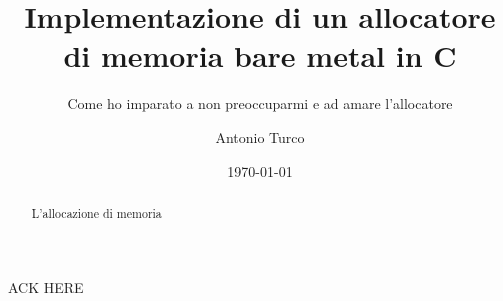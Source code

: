 \documentclass[noexaminfo,oneside,binding=0.6cm]{sapthesis}
\title{Implementazione di un allocatore di memoria bare metal in C}
\subtitle{Come ho imparato a non preoccuparmi e ad amare l'allocatore}
\author{Antonio Turco}
\date{\today}
\begin{document}
\frontmatter  
\maketitle
\dedication{Dedicato a chi rimane curioso per tutta la vita}

\begin{abstract}
  L'allocazione di memoria
\end{abstract}


\mainmatter 
\tableofcontents













\backmatter

\begin{acknowledgments}
  ACK HERE 
\end{acknowledgments}
\end{document}
